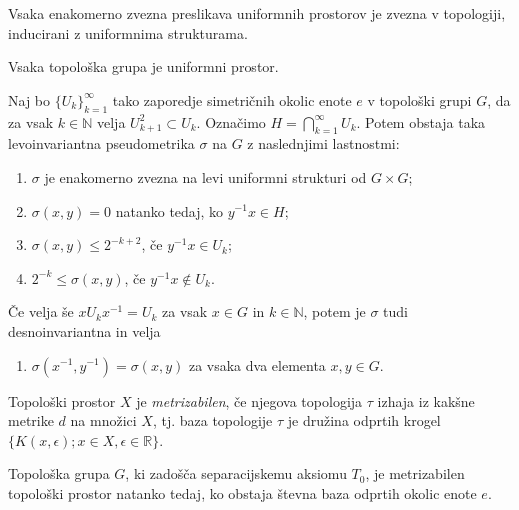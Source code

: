 \documentclass[mat1]{fmfdelo}
\newcommand{\R}{\mathbb R}
\newcommand{\N}{\mathbb N}
\begin{document}
\begin{trditev}\label{trd:enakzveznazvezna}
Vsaka enakomerno zvezna preslikava uniformnih prostorov je zvezna v topologiji, inducirani z uniformnima strukturama.
\end{trditev}

\begin{trditev}\label{trd:topguniform}
Vsaka topološka grupa je uniformni prostor.
\end{trditev}

\begin{izrek}\label{izr:pseudometrika}
	Naj bo $\lbrace U_k \rbrace_{k = 1}^{\infty}$ tako zaporedje simetričnih okolic enote $e$ v topološki grupi $G$, da za vsak $k \in \N$ velja $U_{k+1}^2 \subset U_k$. Označimo $H = \bigcap_{k=1}^{\infty} U_k$. Potem obstaja taka levoinvariantna pseudometrika $\sigma$ na $G$ z naslednjimi lastnostmi:
	\begin{enumerate}
		\item $\sigma$ je enakomerno zvezna na levi uniformni strukturi od $G \times G$;
		\item $\sigma (x, y) = 0$ natanko tedaj, ko $y^{-1}x \in H$;
		\item $\sigma (x, y) \leq 2^{-k+2}$, če $y^{-1}x \in U_k$;
		\item $2^{-k} \leq \sigma (x, y)$, če $y^{-1}x \notin U_k$.
	\end{enumerate}
	
	Če velja še $x U_k x^{-1} = U_k$ za vsak $x \in G$ in $k \in \N$, potem je $\sigma$ tudi desnoinvariantna in velja
	\begin{enumerate}[resume]
		\item $\sigma (x^{-1}, y^{-1}) = \sigma (x, y)$ za vsaka dva elementa $x, y \in G$.
	\end{enumerate}
\end{izrek}

\begin{definicija}\label{def:metrizabilnost}
Topološki prostor $X$ je \emph{metrizabilen}, če njegova topologija $\tau$ izhaja iz kakšne metrike $d$ na množici $X$, tj. baza topologije $\tau$ je družina odprtih krogel $\lbrace K(x, \epsilon); x \in X, \epsilon \in \R \rbrace$.
\end{definicija}

\begin{izrek}\label{izr:metrizabilnost}
	Topološka grupa $G$, ki zadošča separacijskemu aksiomu $T_0$, je metrizabilen topološki prostor natanko tedaj, ko obstaja števna baza odprtih okolic enote $e$.
\end{izrek}
\end{document}
